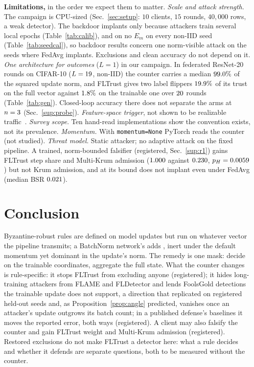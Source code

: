 \documentclass[journal]{IEEEtran}
\begin{document}
\textbf{Limitations,} in the order we expect them to matter.
\emph{Scale and attack strength.} The campaign is CPU-sized
(Sec.~\ref{sec:setup}: $10$ clients, $15$ rounds, $40{,}000$ rows, a weak detector).
The backdoor implants only because attackers train several local epochs
(Table~\ref{tab:calib}), and on no $E_m$ on every non-IID seed (Table~\ref{tab:seedcal}),
so backdoor results concern one norm-visible attack on the seeds where FedAvg implants. Exclusions and clean accuracy do not depend on it.
\emph{One architecture for outcomes} ($L=1$) in our campaign. In federated ResNet-20 rounds on
CIFAR-10 ($L=19$, non-IID) the counter carries a median $99.0\%$ of
the squared update norm, and FLTrust gives two label flippers $19.9\%$ of
its trust on the full vector against $1.8\%$ on the trainable one
over $20$ rounds (Table~\ref{tab:gen}). Closed-loop accuracy there does not
separate the arms at $n=3$ (Sec.~\ref{sup:probe}).
\emph{Feature-space trigger}, not shown to be realizable
traffic~\cite{pierazzi2020problem}.
\emph{Survey scope.} Ten hand-read implementations show the convention exists, not its prevalence.
\emph{Momentum.} With \texttt{momentum=None} PyTorch reads the counter (not studied).
\emph{Threat model.} Static attacker; no adaptive attack on the fixed pipeline. A trained,
norm-bounded falsifier (registered, Sec.~\ref{sup:r1}) gains FLTrust step share and Multi-Krum admission
($1.000$ against $0.230$, $p_H=0.0059$) but not Krum
admission, and at its bound does not implant even under FedAvg (median BSR
$0.021$).

\section{Conclusion}

Byzantine-robust rules are defined on model updates but run on whatever vector the
pipeline transmits; a BatchNorm network's \sd{} adds \nbt{}, inert under the default
momentum yet dominant in the update's norm. The remedy is one mask: decide on the
trainable coordinates, aggregate the full state. What the counter changes is
rule-specific: it stops FLTrust from excluding anyone (registered); it hides long-training attackers from
FLAME and FLDetector and lends FoolsGold detections the trainable update does not support,
a direction that replicated on registered held-out seeds and, as
Proposition~\ref{prop:angle} predicted, vanishes once an attacker's update outgrows its
batch count; in a published defense's baselines it moves the reported error, both ways
(registered). A client may also falsify the counter and gain FLTrust weight and Multi-Krum
admission (registered). Restored exclusions do not make FLTrust a detector here: what a
rule decides and whether it defends are separate questions, both to be measured without the counter.





\end{document}
